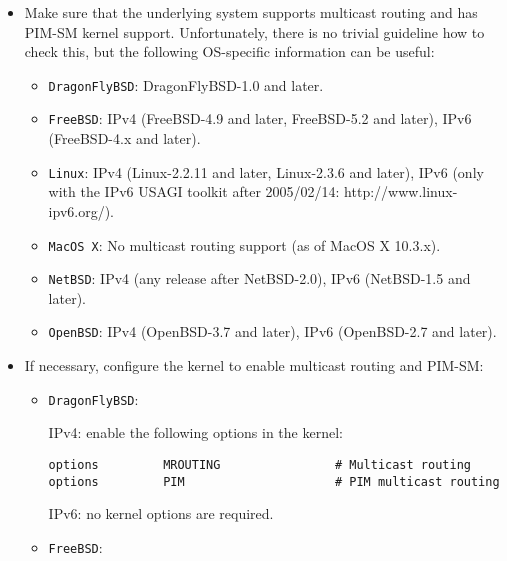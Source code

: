 \begin{itemize}

  \item Make sure that the underlying system supports multicast routing and
  has PIM-SM kernel support. Unfortunately, there is no trivial guideline how
  to check this, but the following OS-specific information can be useful:

  \begin{itemize}

    \item {\tt DragonFlyBSD}: DragonFlyBSD-1.0 and later.

    \item {\tt FreeBSD}: IPv4 (FreeBSD-4.9 and later, FreeBSD-5.2 and later),
    IPv6 (FreeBSD-4.x and later).

    \item {\tt Linux}: IPv4 (Linux-2.2.11 and later, Linux-2.3.6 and later),
    IPv6 (only with the IPv6 USAGI toolkit after 2005/02/14:
    http://www.linux-ipv6.org/).

    \item {\tt MacOS X}: No multicast routing support (as of MacOS X 10.3.x).

    \item {\tt NetBSD}: IPv4 (any release after NetBSD-2.0), IPv6 (NetBSD-1.5
    and later).

    \item {\tt OpenBSD}: IPv4 (OpenBSD-3.7 and later), IPv6 (OpenBSD-2.7 and
    later).

  \end{itemize}

  \item If necessary, configure the kernel to enable multicast routing and
  PIM-SM:

  \begin{itemize}

    \item {\tt DragonFlyBSD}:

    IPv4: enable the following options in the kernel:

\begin{verbatim}
options         MROUTING                # Multicast routing
options         PIM                     # PIM multicast routing
\end{verbatim}

    IPv6: no kernel options are required.

    \item {\tt FreeBSD}:


\end{itemize}
\end{itemize}
